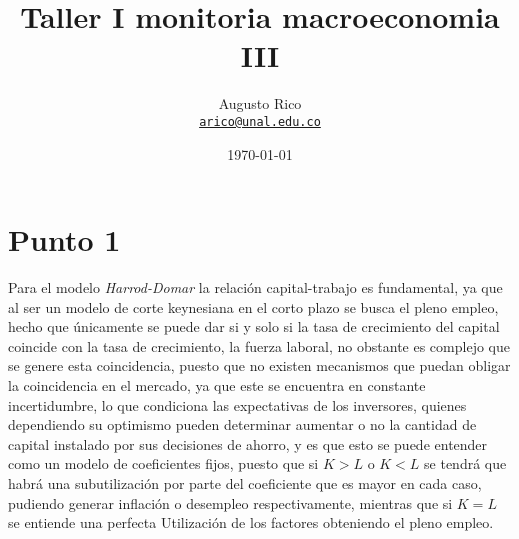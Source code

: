 \documentclass[11pt]{article}
\title{Taller I monitoria macroeconomia III
}
\author{Augusto Rico\\
    \href{mailto:arico@unal.edu.co}{\texttt{arico@unal.edu.co}}
}
\date{\today}
\begin{document}
{ %
\maketitle



\section{Punto 1}
\begin{flushleft}    Para el modelo \textit{Harrod-Domar} la relación capital-trabajo es fundamental, ya que al ser un modelo de corte keynesiana en el corto plazo se busca 
    el pleno empleo, hecho que únicamente se puede dar si y solo si la tasa de crecimiento del capital coincide con la tasa de crecimiento, la fuerza laboral, 
    no obstante es complejo que se genere esta coincidencia, puesto que no existen mecanismos que puedan obligar la coincidencia en el mercado, ya que este se 
    encuentra en constante incertidumbre, lo que condiciona las expectativas de los inversores, quienes dependiendo su optimismo pueden determinar aumentar o
    no la cantidad de capital instalado por sus decisiones de ahorro, y es que esto se puede entender como un modelo de coeficientes fijos, puesto que si $K>L$ o $K<L$
    se tendrá que habrá una subutilización por parte del coeficiente que es mayor en cada caso, pudiendo generar inflación o desempleo respectivamente, mientras que si $K=L$ se entiende una perfecta
    Utilización de los factores obteniendo el pleno empleo.
\end{flushleft}

}
\end{document}
